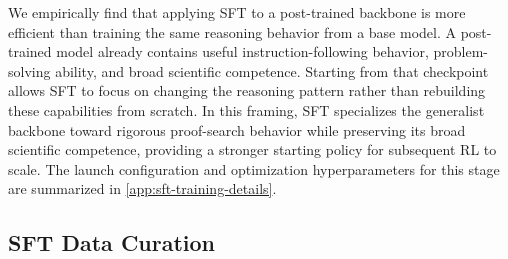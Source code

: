 \documentclass{llmxive}
\begin{document}
We empirically find that applying SFT to a post-trained backbone is more
efficient than training the same reasoning behavior from a base model. A
post-trained model already contains useful instruction-following behavior,
problem-solving ability, and broad scientific competence. Starting from
that checkpoint allows SFT to focus on changing the reasoning pattern rather
than rebuilding these capabilities from scratch. 
In this framing, SFT specializes the generalist backbone toward rigorous proof-search behavior while preserving its broad scientific competence, providing a stronger
  starting policy for subsequent RL to scale. 
The launch configuration and optimization
hyperparameters for this stage are summarized in
\cref{app:sft-training-details}. 




\subsection{SFT Data Curation}
\label{sec:sft-data-curation}
\end{document}
